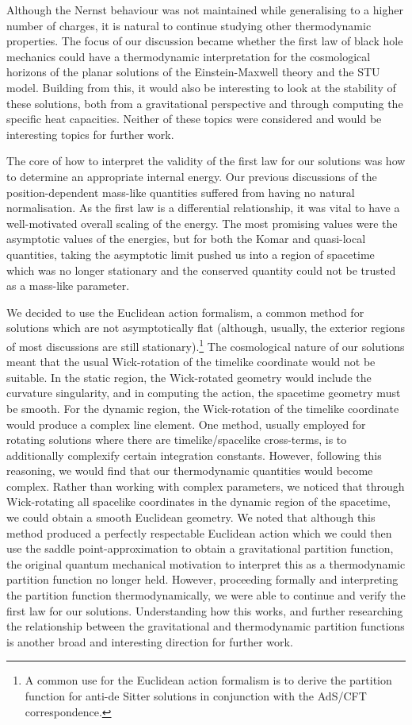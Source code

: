 Although the Nernst behaviour was not maintained while generalising to a higher number of charges, it is natural to continue studying other thermodynamic properties. The focus of our discussion became whether the first law of black hole mechanics could have a thermodynamic interpretation for the cosmological horizons of the planar solutions of the Einstein-Maxwell theory and the STU model. Building from this, it would also be interesting to look at the stability of these solutions, both from a gravitational perspective and through computing the specific heat capacities. Neither of these topics were considered and would be interesting topics for further work.

The core of how to interpret the validity of the first law for our solutions was how to determine an appropriate internal energy. Our previous discussions of the position-dependent mass-like quantities suffered from having no natural normalisation. As the first law is a differential relationship, it was vital to have a well-motivated overall scaling of the energy. The most promising values were the asymptotic values of the energies, but for both the Komar and quasi-local quantities, taking the asymptotic limit pushed us into a region of spacetime which was no longer stationary and the conserved quantity could not be trusted as a mass-like parameter.

We decided to use the Euclidean action formalism, a common method for solutions which are not asymptotically flat (although, usually, the exterior regions of most discussions are still stationary).\footnote{A common use for the Euclidean action formalism is to derive the partition function for anti-de Sitter solutions in conjunction with the AdS/CFT correspondence.} The cosmological nature of our solutions meant that the usual Wick-rotation of the timelike coordinate would not be suitable. In the static region, the Wick-rotated geometry would include the curvature singularity, and in computing the action, the spacetime geometry must be smooth. For the dynamic region, the Wick-rotation of the timelike coordinate would produce a complex line element. One method, usually employed for rotating solutions where there are timelike/spacelike cross-terms, is to additionally complexify certain integration constants. However, following this reasoning, we would find that our thermodynamic quantities would become complex. Rather than working with complex parameters, we noticed that through Wick-rotating all spacelike coordinates in the dynamic region of the spacetime, we could obtain a smooth Euclidean geometry. We noted that although this method produced a perfectly respectable Euclidean action which we could then use the saddle point-approximation to obtain a gravitational partition function, the original quantum mechanical motivation to interpret this as a thermodynamic partition function no longer held. However, proceeding formally and interpreting the partition function thermodynamically, we were able to continue and verify the first law for our solutions. Understanding how this works, and further researching the relationship between the gravitational and thermodynamic partition functions is another broad and interesting direction for further work.

